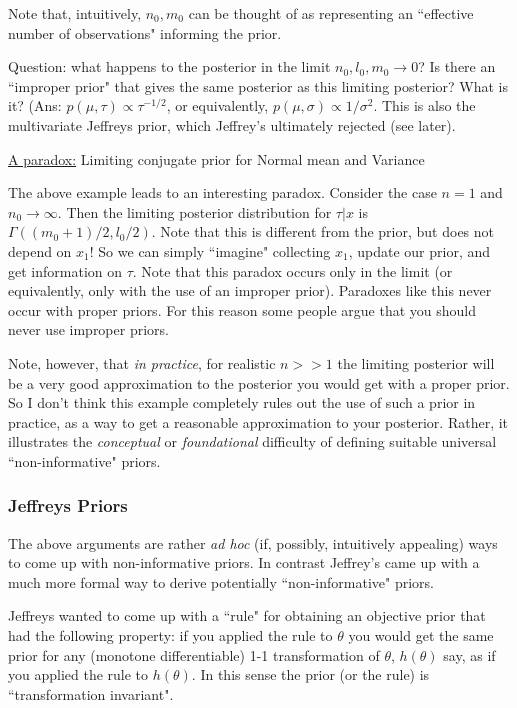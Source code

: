 \documentclass[12pt]{article}
\def\ni{\noindent}
\begin{document}
Note that, intuitively,  $n_0,m_0$ can be thought of as representing an ``effective number of observations" informing the prior. 

Question: what happens to the posterior in the limit $n_0, l_0,m_0 \rightarrow 0$?
Is there an ``improper prior" that
gives the same posterior as this limiting posterior?
What is it? (Ans: $p(\mu,\tau) \propto \tau^{-1/2}$,
or equivalently, $p(\mu,\sigma) \propto 1/\sigma^2$. This is also the multivariate Jeffreys prior, which Jeffrey's ultimately rejected (see later).

\ni\underline{A  paradox:} Limiting conjugate prior for Normal mean and Variance
\vskip 2mm

The above example leads to an interesting paradox. Consider the case $n=1$ and $n_0 \rightarrow \infty$. Then the limiting posterior distribution for $\tau | x$ is  $\Gamma( (m_0+1)/2,l_0/2)$. Note that this is different from the
prior, but does not depend on $x_1$! So we can simply ``imagine" collecting $x_1$, update
our prior, and get information on $\tau$.
Note that this paradox occurs only in the limit
(or equivalently, only with the use of an
improper prior). Paradoxes like this
never occur with proper priors. For this reason
some people argue that you should never use improper priors. 

Note, however, that {\it in practice}, for realistic $n >>1$ the limiting posterior will
be a very good approximation to the posterior
you would get with a proper prior. So I don't think
this example completely rules out the use of such a prior in practice, as a way to get a reasonable approximation to your posterior. Rather, it illustrates the {\it conceptual} or {\it foundational} difficulty of defining
suitable universal ``non-informative" priors. 




\subsubsection{Jeffreys Priors}

The above arguments are rather {\it ad hoc} (if, possibly, intuitively appealing)
ways to come up with non-informative priors. 
In contrast Jeffrey's came up with a much more formal way to derive potentially ``non-informative" priors.

Jeffreys wanted to come up with a ``rule" for obtaining an objective prior that had the following property: if you applied the rule to $\theta$
you would get the same prior for any (monotone differentiable) 1-1 transformation of $\theta$, $h(\theta)$ say, as if you applied the rule to $h(\theta)$. In this sense the prior (or the rule) is ``transformation invariant".
\end{document}

